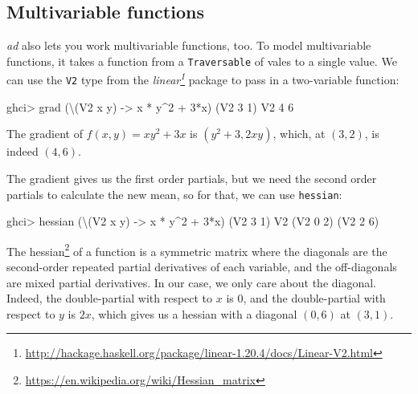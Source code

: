 \documentclass[]{article}
\newenvironment{Shaded}{}{}
\newcommand{\DataTypeTok}[1]{\textcolor[rgb]{0.56,0.13,0.00}{{#1}}}
\newcommand{\DecValTok}[1]{\textcolor[rgb]{0.25,0.63,0.44}{{#1}}}
\newcommand{\OtherTok}[1]{\textcolor[rgb]{0.00,0.44,0.13}{{#1}}}
\newcommand{\FunctionTok}[1]{\textcolor[rgb]{0.02,0.16,0.49}{{#1}}}
\newcommand{\NormalTok}[1]{{#1}}
\renewcommand{\href}[2]{#2\footnote{\url{#1}}}
\begin{document}
\subsection{Multivariable functions}\label{multivariable-functions}

\emph{ad} also lets you work multivariable functions, too. To model
multivariable functions, it takes a function from a \texttt{Traversable}
of vales to a single value. We can use the \texttt{V2} type from the
\emph{\href{http://hackage.haskell.org/package/linear-1.20.4/docs/Linear-V2.html}{linear}}
package to pass in a two-variable function:

\begin{Shaded}
\begin{Highlighting}[]
\NormalTok{ghci}\FunctionTok{>} \NormalTok{grad (\textbackslash{}(}\DataTypeTok{V2} \NormalTok{x y) }\OtherTok{->} \NormalTok{x }\FunctionTok{*} \NormalTok{y}\FunctionTok{^}\DecValTok{2} \FunctionTok{+} \DecValTok{3}\FunctionTok{*}\NormalTok{x) (}\DataTypeTok{V2} \DecValTok{3} \DecValTok{1}\NormalTok{)}
\DataTypeTok{V2} \DecValTok{4} \DecValTok{6}
\end{Highlighting}
\end{Shaded}

The gradient of \(f(x, y) = x y^2 + 3x\) is \((y^2 + 3, 2xy)\), which,
at \((3, 2)\), is indeed \((4, 6)\).

The gradient gives us the first order partials, but we need the second
order partials to calculate the new mean, so for that, we can use
\texttt{hessian}:

\begin{Shaded}
\begin{Highlighting}[]
\NormalTok{ghci}\FunctionTok{>} \NormalTok{hessian (\textbackslash{}(}\DataTypeTok{V2} \NormalTok{x y) }\OtherTok{->} \NormalTok{x }\FunctionTok{*} \NormalTok{y}\FunctionTok{^}\DecValTok{2} \FunctionTok{+} \DecValTok{3}\FunctionTok{*}\NormalTok{x) (}\DataTypeTok{V2} \DecValTok{3} \DecValTok{1}\NormalTok{)}
\DataTypeTok{V2} \NormalTok{(}\DataTypeTok{V2} \DecValTok{0} \DecValTok{2}\NormalTok{)}
   \NormalTok{(}\DataTypeTok{V2} \DecValTok{2} \DecValTok{6}\NormalTok{)}
\end{Highlighting}
\end{Shaded}

The \href{https://en.wikipedia.org/wiki/Hessian_matrix}{hessian} of a
function is a symmetric matrix where the diagonals are the second-order
repeated partial derivatives of each variable, and the off-diagonals are
mixed partial derivatives. In our case, we only care about the diagonal.
Indeed, the double-partial with respect to \(x\) is \(0\), and the
double-partial with respect to \(y\) is \(2x\), which gives us a hessian
with a diagonal \((0, 6)\) at \((3, 1)\).
\end{document}
